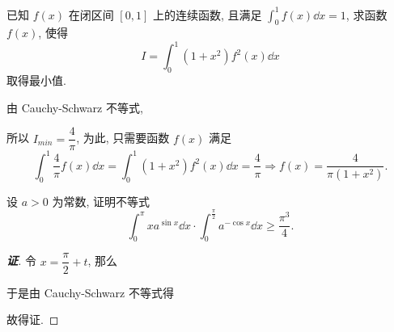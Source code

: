\begin{example}
    已知 $f(x)$ 在闭区间 $[0,1]$ 上的连续函数, 且满足 $\displaystyle\int_{0}^{1} f(x)\dd x=1$, 求函数 $f(x)$, 使得 $$\displaystyle I=\int_{0}^{1}(1+x^2)f^2(x)\dd x$$ 取得最小值.
\end{example}
\begin{solution}
    由 Cauchy-Schwarz 不等式,
    所以 $I_{min}=\dfrac{4}{\pi}$, 为此, 只需要函数 $f(x)$ 满足 $$\displaystyle\int_{0}^{1}\dfrac{4}{\pi}f(x)\dd x=\int_{0}^{1}(1+x^2)f^2(x)\dd x=\dfrac{4}{\pi}\Rightarrow f(x)=\dfrac{4}{\pi(1+x^2)}.$$
\end{solution}

\begin{example}
    设 $a>0$ 为常数, 证明不等式 $$\int_{0}^{\pi}xa^{\sin x}\dd x\cdot\int_{0}^{\frac{\pi}{2}}a^{-\cos x}\dd x\geqslant\dfrac{\pi^3}{4}.$$
\end{example}
\begin{proof}[{\songti \textbf{证}}]
    令 $x=\dfrac{\pi}{2}+t$, 那么
    于是由 Cauchy-Schwarz 不等式得
    故得证.
\end{proof}

